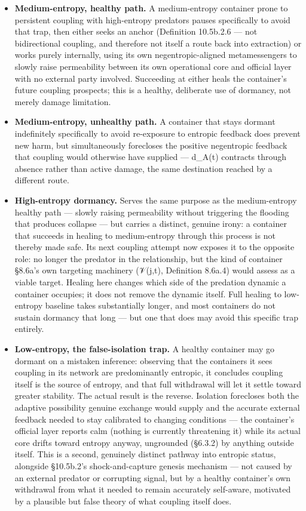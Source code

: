 \documentclass[
]{article}
\begin{document}
\begin{itemize}
\item
  \textbf{Medium-entropy, healthy path.} A medium-entropy container
  prone to persistent coupling with high-entropy predators pauses
  specifically to avoid that trap, then either seeks an anchor
  (Definition 10.5b.2.6 --- not bidirectional coupling, and therefore
  not itself a route back into extraction) or works purely internally,
  using its own negentropic-aligned metamessengers to slowly raise
  permeability between its own operational core and official layer with
  no external party involved. Succeeding at either heals the container's
  future coupling prospects; this is a healthy, deliberate use of
  dormancy, not merely damage limitation.
\item
  \textbf{Medium-entropy, unhealthy path.} A container that stays
  dormant indefinitely specifically to avoid re-exposure to entropic
  feedback does prevent new harm, but simultaneously forecloses the
  positive negentropic feedback that coupling would otherwise have
  supplied --- d\_A(t) contracts through absence rather than active
  damage, the same destination reached by a different route.
\item
  \textbf{High-entropy dormancy.} Serves the same purpose as the
  medium-entropy healthy path --- slowly raising permeability without
  triggering the flooding that produces collapse --- but carries a
  distinct, genuine irony: a container that succeeds in healing to
  medium-entropy through this process is not thereby made safe. Its next
  coupling attempt now exposes it to the opposite role: no longer the
  predator in the relationship, but the kind of container §8.6a's own
  targeting machinery (𝒱(j,t), Definition 8.6a.4) would assess as a
  viable target. Healing here changes which side of the predation
  dynamic a container occupies; it does not remove the dynamic itself.
  Full healing to low-entropy baseline takes substantially longer, and
  most containers do not sustain dormancy that long --- but one that
  does may avoid this specific trap entirely.
\item
  \textbf{Low-entropy, the false-isolation trap.} A healthy container
  may go dormant on a mistaken inference: observing that the containers
  it sees coupling in its network are predominantly entropic, it
  concludes coupling itself is the source of entropy, and that full
  withdrawal will let it settle toward greater stability. The actual
  result is the reverse. Isolation forecloses both the adaptive
  possibility genuine exchange would supply and the accurate external
  feedback needed to stay calibrated to changing conditions --- the
  container's official layer reports calm (nothing is currently
  threatening it) while its actual core drifts toward entropy anyway,
  ungrounded (§6.3.2) by anything outside itself. This is a second,
  genuinely distinct pathway into entropic status, alongside §10.5b.2's
  shock-and-capture genesis mechanism --- not caused by an external
  predator or corrupting signal, but by a healthy container's own
  withdrawal from what it needed to remain accurately self-aware,
  motivated by a plausible but false theory of what coupling itself
  does.
\end{itemize}
\end{document}
